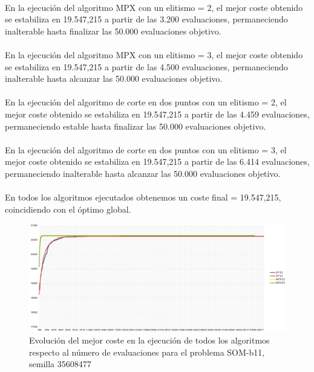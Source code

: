 	\paragraph{}En la ejecución del algoritmo MPX con un elitismo = 2, el mejor coste obtenido se estabiliza en 19.547,215 a partir de las 3.200 evaluaciones, permaneciendo inalterable hasta finalizar las 50.000 evaluaciones objetivo.
	
	\paragraph{}En la ejecución del algoritmo MPX con un elitismo = 3, el mejor coste obtenido se estabiliza en 19.547,215 a partir de las 4.500 evaluaciones, permaneciendo inalterable hasta alcanzar las 50.000 evaluaciones objetivo.
	
	\paragraph{}En la ejecución del algoritmo de corte en dos puntos con un elitismo = 2, el mejor coste obtenido se estabiliza en 19.547,215 a partir de las 4.459 evaluaciones, permaneciendo estable hasta finalizar las 50.000 evaluaciones objetivo.
	
	\paragraph{}En la ejecución del algoritmo de corte en dos puntos con un elitismo = 3, el mejor coste obtenido se estabiliza en 19.547,215 a partir de las 6.414 evaluaciones, permaneciendo inalterable hasta alcanzar las 50.000 evaluaciones objetivo.
	
	\paragraph{}En todos los algoritmos ejecutados obtenemos un coste final = 19.547,215, coincidiendo con el óptimo global.

	\begin{figure}[H]
		\centering
		\includegraphics[scale=0.3]{img/35608477_SOM-b_11_n300_m90.png}
		\caption{Evolución del mejor coste en la ejecución de todos los algoritmos respecto al número de evaluaciones para el problema SOM-b11, semilla 35608477}
		\label{SOM-b_11_historico}
	\end{figure}

